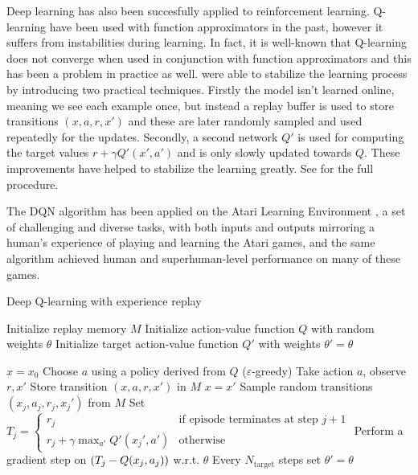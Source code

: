 Deep learning has also been succesfully applied to reinforcement learning. Q-learning have been used with function approximators in the past\cite{neco}, however it suffers from instabilities during learning. In fact, it is well-known that Q-learning does not converge when used in conjunction with function approximators \cite{...} and this has been a problem in practice as well. \citet{mnih2015human} were able to stabilize the learning process by introducing two practical techniques. Firstly the model isn't learned online, meaning we see each example once, but instead a replay buffer is used to store transitions $(x, a, r, x')$ and these are later randomly sampled and used repeatedly for the updates. Secondly, a second network $Q'$ is used for computing the target values $r + \gamma Q'(x', a')$ and is only slowly updated towards $Q$. These improvements have helped to stabilize the learning greatly. See  for the full procedure.

The DQN algorithm has been applied on the Atari Learning Environment \cite{atari}, a set of challenging and diverse tasks, with both inputs and outputs mirroring a human's experience of playing and learning the Atari games, and the same algorithm achieved human and superhuman-level performance on many of these games.

\begin{algorithm}
\caption{Deep Q-learning with experience replay}
\begin{algorithmic}\label{alg:dqn}

    \STATE Initialize replay memory $M$
    \STATE Initialize action-value function $Q$ with random weights $\theta$
    \STATE Initialize target action-value function $Q'$ with weights $\theta'=\theta$

    \STATE $x=x_0$
	\STATE Choose $a$ using a policy derived from $Q$ ($\varepsilon$-greedy)
	\STATE Take action $a$, observe $r, x'$
	\STATE Store transition $(x, a, r, x')$ in $M$
	\STATE $x = x'$
	\STATE Sample random transitions $(x_j, a_j, r_j, x_j')$ from $M$
	\STATE Set $T_j=\begin{cases}
      r_j & \text{if episode terminates at step } j+1\\
      r_j + \gamma \max_{a'} Q'(x_j', a') & \text{otherwise}
    \end{cases}$
    \STATE Perform a gradient step on $\left( {T_j - Q(x_j, a_j)} \right)$ w.r.t. $\theta$
    \STATE Every $N_\text{target}$ steps set $\theta'=\theta$
	\ENDWHILE
	\ENDFOR
	
\end{algorithmic}
\end{algorithm}

